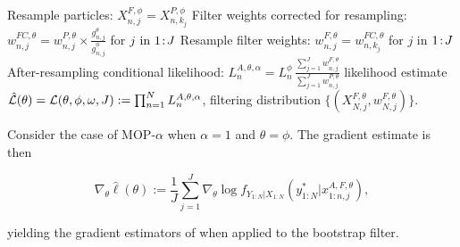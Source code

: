 \documentclass{article}
\begin{document}
\begin{algorithm}[H]
\begin{algorithmic}[1]
            \STATE Resample particles: ${X}_{n,j}^{F,\phi}={X}_{n,k_{j}}^{P,\phi}$
            \STATE Filter weights corrected for resampling:
            $\displaystyle w^{FC,\theta}_{n,j}= w^{P,\theta}_{n,j} \times \frac{ g^{\theta}_{n,j}}{ g^{\phi}_{n,j}}$ for $j\ \mathrm{in}\ {1}\!:\!{J}$ \label{dop-alpha:weight:update}
            \STATE Resample filter weights:
            $w_{n,j}^{F,\theta}= {w}_{n,k_{j}}^{FC,\theta}$
            for $j$ in ${1}\!:\!{J}$ \label{dop-alpha:step2}
            \STATE After-resampling conditional likelihood: $\displaystyle L_n^{A,\theta,\alpha} = L_n^\phi \, \frac{\sum_{j=1}^J w^{F,\theta}_{n,j}}{\sum_{j=1}^J  w^{P,\theta}_{n,j}}$
            \ENDFOR
		\RETURN likelihood estimate $\hat{\mathcal{L}}(\theta) = \mathcal{L}(\theta, \phi, \omega, J) := \prod_{n=1}^N L_n^{A,\theta,\alpha}$, filtering distribution $\{(X_{N,j}^{F, \theta}, w^{F,\theta}_{N,j})\}.$
	\end{algorithmic}
\end{algorithm}

\begin{lem}
    Consider the case of MOP-$\alpha$ when $\alpha=1$ and $\theta=\phi$. The gradient estimate is then

    \begin{equation}
        \nabla_\theta \hat{\ell}(\theta) := \frac{1}{J}\sum_{j=1}^J \nabla_\theta \log f_{Y_{1:N}|X_{1:N}}\left(y_{1:N}^* | x_{1:n,j}^{A, F,\theta}\right),
    \end{equation}

    yielding the gradient estimators of \cite{poyiadjis11, scibior2021dpf} when applied to the bootstrap filter. 
\end{lem}
\end{document}
